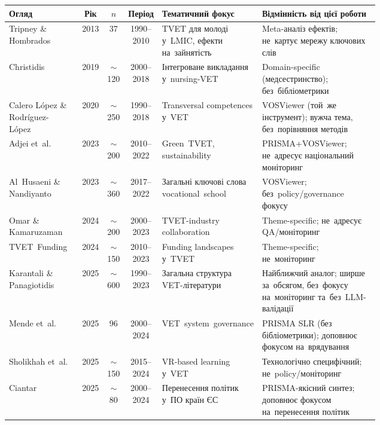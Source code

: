 \setlength\tabcolsep{3pt}
\renewcommand{\arraystretch}{1.05}
\begin{tabular}{|p{0.20\linewidth}|c|c|c|p{0.18\linewidth}|p{0.34\linewidth}|}
\hline
\textbf{Огляд} & \textbf{Рік} & \textbf{$n$} & \textbf{Період} & \textbf{Тематичний фокус} & \textbf{Відмінність від цієї роботи} \\
\hline
Tripney \& Hombrados~\cite{Tripney2013TVETLMIC} & 2013 & 37 & 1990--2010 & TVET для молоді у~LMIC, ефекти на~зайнятість & Meta-аналіз ефектів; не~картує мережу ключових слів \\
\hline
Christidis~\cite{Christidis2019NursingVET} & 2019 & $\sim$120 & 2000--2018 & Інтегроване викладання у~nursing-VET & Domain-specific (медсестринство); без~бібліометрики \\
\hline
Calero L\'opez \& Rodr\'iguez-L\'opez~\cite{Calero2020Transversal} & 2020 & $\sim$250 & 1990--2018 & Transversal competences у~VET & VOSViewer (той~же інструмент); вужча тема, без~порівняння методів \\
\hline
Adjei et~al.~\cite{Adjei2023GreenTVET} & 2023 & $\sim$200 & 2010--2022 & Green~TVET, sustainability & PRISMA+VOSViewer; не~адресує національний моніторинг \\
\hline
Al~Husaeni \& Nandiyanto~\cite{Husaeni2023VocSchoolVOS} & 2023 & $\sim$360 & 2017--2022 & Загальні ключові слова vocational~school & VOSViewer; без~policy/governance фокусу \\
\hline
Omar \& Kamaruzaman~\cite{Omar2024TVETIndustry} & 2024 & $\sim$200 & 2000--2023 & TVET-industry collaboration & Theme-specific; не~адресує QA/моніторинг \\
\hline
TVET~Funding~\cite{TVETFunding2024} & 2024 & $\sim$150 & 2010--2023 & Funding landscapes у~TVET & Theme-specific; не~моніторинг \\
\hline
Karantali \& Panagiotidis~\cite{Karantali2025VETBiblio} & 2025 & $\sim$600 & 1990--2023 & Загальна структура VET-літератури & Найближчий аналог; ширше за~обсягом, без~фокусу на~моніторинг та~без~LLM-валідації \\
\hline
Mende et~al.~\cite{Mende2025VETgovernance} & 2025 & 96 & 2000--2024 & VET~system~governance & PRISMA SLR (без бібліометрики); доповнює фокусом на~врядування \\
\hline
Sholikhah et~al.~\cite{Sholikhah2025VRVET} & 2025 & $\sim$150 & 2015--2024 & VR-based learning у~VET & Технологічно специфічний; не~policy/моніторинг \\
\hline
Ciantar~\cite{Ciantar2025VETPolicy} & 2025 & $\sim$80 & 2000--2024 & Перенесення політик у~ПО країн ЄС & PRISMA-якісний синтез; доповнює фокусом на~перенесення політик \\
\hline
\end{tabular}
